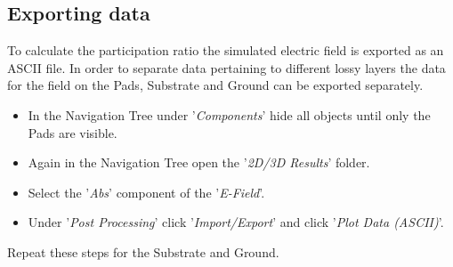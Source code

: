 \subsection{Exporting data}
To calculate the participation ratio the simulated electric field is exported as an ASCII file. In order to separate data pertaining to different lossy layers the data for the field on the Pads, Substrate and Ground can be exported separately. 
\begin{itemize}
	\item In the Navigation Tree under '\textit{Components}' hide all objects until only the Pads are visible.
	\item Again in the Navigation Tree open the '\textit{2D/3D Results}' folder.
	\item Select the '\textit{Abs}' component of the '\textit{E-Field}'.
	\item Under '\textit{Post Processing}' click '\textit{Import/Export}' and click '\textit{Plot Data (ASCII)}'. 
\end{itemize}
Repeat these steps for the Substrate and Ground.